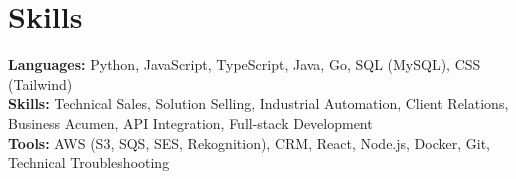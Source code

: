 \documentclass[11pt]{article}       %
\begin{document}
\vspace{-18.5pt}


\section*{Skills}
\textbf{Languages:} Python, JavaScript, TypeScript, Java, Go, SQL (MySQL), CSS (Tailwind)\\
\textbf{Skills:} Technical Sales, Solution Selling, Industrial Automation, Client Relations, Business Acumen, API Integration, Full-stack Development\\
\textbf{Tools:} AWS (S3, SQS, SES, Rekognition), CRM, React, Node.js, Docker, Git, Technical Troubleshooting\\

\vspace{-6.5pt}
\end{document}
